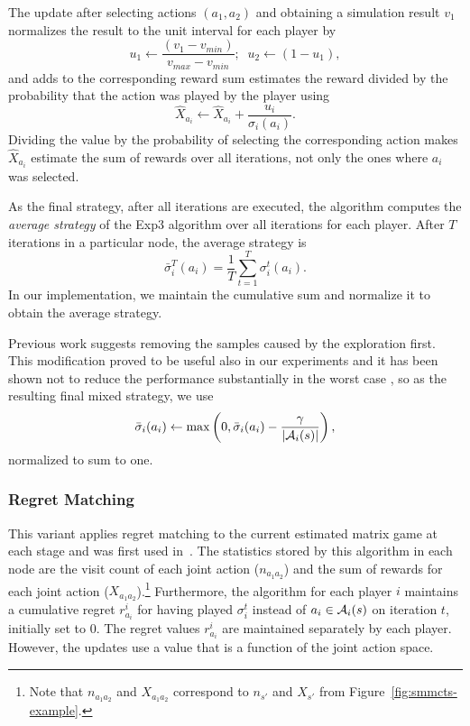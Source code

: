 The update after selecting actions $(a_1,a_2)$ and obtaining a simulation result $v_1$ normalizes the result to the unit interval for each player by
\begin{equation}
u_1 \leftarrow \frac{(v_1 - v_{min})}{v_{max} - v_{min}};\;\; u_2 \leftarrow (1-u_1),
\end{equation}
and adds to the corresponding reward sum estimates the reward divided by the probability that the action was played by the player using
\begin{equation}
\hat{X}_{a_i} \leftarrow \hat{X}_{a_i} + \frac{u_i}{\sigma_i(a_i)}.
\end{equation}
Dividing the value by the probability of selecting the corresponding action makes $\hat{X}_{a_i}$ estimate the sum of rewards over all
iterations, not only the ones where $a_i$ was selected.

As the final strategy, after all iterations are executed, the algorithm computes the \emph{average strategy} of the Exp3 algorithm over all iterations for each player.
 After $T$ iterations in a particular node, the average strategy is
\begin{equation}
\bar{\sigma}^T_i(a_i) = \frac{1}{T}\sum_{t=1}^T \sigma^t_i(a_i).
\end{equation}
In our implementation, we maintain the cumulative sum and normalize it to obtain the average strategy.

Previous work \cite{Teytaud11Upper} suggests removing the samples caused by the exploration first.
This modification proved to be useful also in our experiments and it has been shown not to reduce the performance substantially in the worst case \cite{Kovarik2015Analysis},
so as the resulting final mixed strategy, we use
\begin{equation}
\bar{\sigma}_i(a_i) \leftarrow \max\left(0, \bar{\sigma}_i(a_i) - \frac{\gamma}{|\mathcal{A}_i(s)|}\right),
\end{equation}
normalized to sum to one.

\subsubsection{Regret Matching} \label{sec:rm}

This variant applies regret matching \cite{Hart00} to the current estimated matrix game at each stage and was first used in~\cite{Lanctot13Goofspiel}. The statistics stored by this algorithm in each node are the visit count of each joint action ($n_{a_1a_2}$) and the sum of rewards for each joint action ($X_{a_1a_2}$).\footnote{Note that $n_{a_1a_2}$ and $X_{a_1a_2}$ correspond to $n_{s'}$ and $X_{s'}$ from Figure~\ref{fig:smmcts-example}.}
Furthermore, the algorithm for each player $i$ maintains a cumulative regret $r^i_{a_i}$ for having played $\sigma_i^t$ instead of $a_i \in \mathcal{A}_i(s)$ on iteration $t$, initially set to 0. The regret values $r^i_{a_i}$ are maintained separately by each player. However, the updates use a value that is a function of the joint action space.

